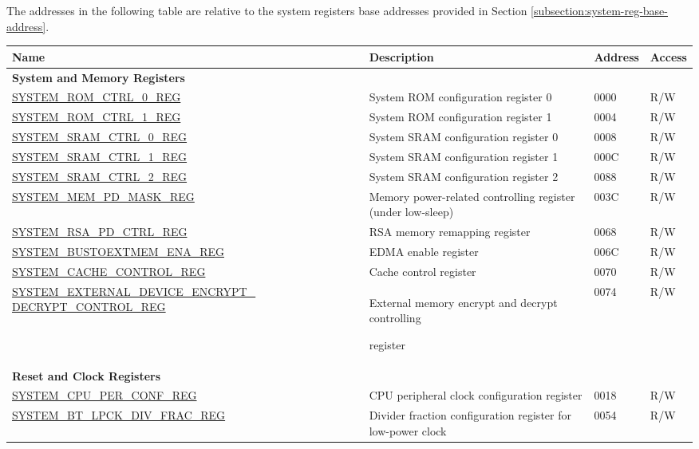 The addresses in the following table are relative to the system registers base addresses provided in Section \ref{subsection:system-reg-base-address}.

\begin{longtable}{ | p{6.5cm} | p{7.5cm} | p{1.3cm} | p{1cm} | }
\hline\rowcolor{lightgray}
Name & Description &  Address & Access \\ \hline
\endhead
\multicolumn{4}{|l|}{\textbf{System and Memory Registers}} \\ \hline
\hyperref[regdesc:SYSTEMROMCTRL0REG]{SYSTEM\_ROM\_CTRL\_0\_REG} & System ROM configuration register 0 & \hexprefix{}0000 & R/W \\ \hline
\hyperref[regdesc:SYSTEMROMCTRL1REG]{SYSTEM\_ROM\_CTRL\_1\_REG} & System ROM configuration register 1 & \hexprefix{}0004 & R/W \\ \hline
\hyperref[regdesc:SYSTEMSRAMCTRL0REG]{SYSTEM\_SRAM\_CTRL\_0\_REG} & System SRAM configuration register 0 & \hexprefix{}0008 & R/W \\ \hline
\hyperref[regdesc:SYSTEMSRAMCTRL1REG]{SYSTEM\_SRAM\_CTRL\_1\_REG} & System SRAM configuration register 1 & \hexprefix{}000C & R/W \\ \hline
\hyperref[regdesc:SYSTEMSRAMCTRL2REG]{SYSTEM\_SRAM\_CTRL\_2\_REG} & System SRAM configuration register 2 & \hexprefix{}0088 & R/W \\ \hline
\hyperref[regdesc:SYSTEMMEMPDMASKREG]{SYSTEM\_MEM\_PD\_MASK\_REG} & Memory power-related controlling register (under low-sleep) & \hexprefix{}003C & R/W \\ \hline
\hyperref[regdesc:SYSTEMRSAPDCTRLREG]{SYSTEM\_RSA\_PD\_CTRL\_REG} & RSA memory remapping register & \hexprefix{}0068 & R/W \\ \hline
\hyperref[regdesc:SYSTEMBUSTOEXTMEMENAREG]{SYSTEM\_BUSTOEXTMEM\_ENA\_REG} & EDMA enable register & \hexprefix{}006C & R/W \\ \hline
\hyperref[regdesc:SYSTEMCACHECONTROLREG]{SYSTEM\_CACHE\_CONTROL\_REG} & Cache control register & \hexprefix{}0070 & R/W \\ \hline
\hyperref[regdesc:SYSTEMEXTERNALDEVICEENCRYPTDECRYPTCONTROLREG]{SYSTEM\_EXTERNAL\_DEVICE\_ENCRYPT\_}  \hyperref[regdesc:SYSTEMEXTERNALDEVICEENCRYPTDECRYPTCONTROLREG]{DECRYPT\_CONTROL\_REG}  & External memory encrypt and decrypt controlling

register & \multirow{2}{*}{\hexprefix{}0074}  & \multirow{2}{*}{R/W} \\ \hline

\multicolumn{4}{|l|}{\textbf{Reset and Clock Registers}} \\ \hline
\hyperref[regdesc:SYSTEMCPUPERCONFREG]{SYSTEM\_CPU\_PER\_CONF\_REG} & CPU peripheral clock configuration register & \hexprefix{}0018 & R/W \\ \hline
\hyperref[regdesc:SYSTEMBTLPCKDIVFRACREG]{SYSTEM\_BT\_LPCK\_DIV\_FRAC\_REG} & Divider fraction configuration register for low-power clock & \hexprefix{}0054 & R/W \\ \hline


\end{longtable}
